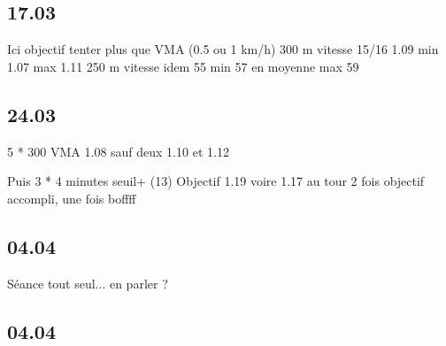 \documentclass{article}%
\begin{document}
    
    \subsection{17.03}
        Ici objectif tenter plus que VMA (0.5 ou 1 km/h)
        300 m vitesse 15/16
        1.09 min 1.07 max 1.11
        250 m vitesse idem
        55 min 57 en moyenne max 59
        
        
    \subsection{24.03}
        5 * 300 VMA
        1.08 sauf deux 1.10 et 1.12
        
        Puis 3 * 4 minutes seuil+ (13)
        Objectif 1.19 voire 1.17 au tour
        2 fois objectif accompli, une fois boffff
        
        
    \subsection{04.04}
        Séance tout seul... en parler ?
        
        
    \subsection{04.04}
        
\end{document}
